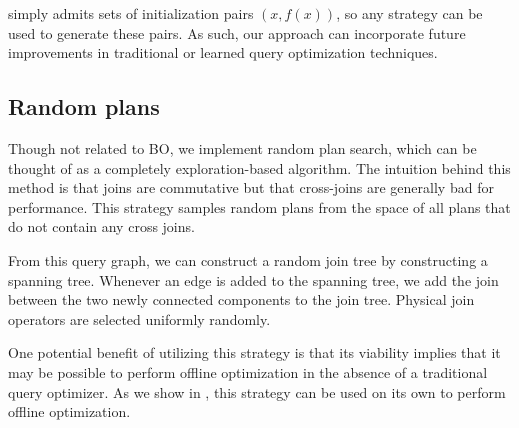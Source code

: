  \sysname simply admits sets of initialization pairs $(x, f(x))$, so any strategy can be used to generate these pairs. As such, our approach can incorporate future improvements in traditional or learned query optimization techniques.


\subsection{Random plans} \label{sec:random}
Though not related to BO, we implement random plan search, which can be thought of as a completely exploration-based algorithm. The intuition behind this method is that joins are commutative but that cross-joins are generally bad for performance. This strategy samples random plans from the space of all plans that do not contain any cross joins.



From this query graph, we can construct a random join tree by constructing a spanning tree. Whenever an edge is added to the spanning tree, we add the join between the two newly connected components to the join tree. Physical join operators are selected uniformly randomly.

One potential benefit of utilizing this strategy is that its viability implies that it may be possible to perform offline optimization in the absence of a traditional query optimizer. As we show in , this strategy can be used on its own to perform offline optimization.








